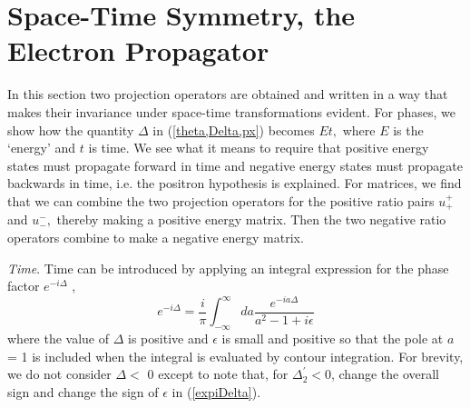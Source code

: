 \documentclass[a4paper,12pt]{article}
\begin{document}
\section{Space-Time Symmetry, the Electron Propagator} \label{space-time} %

	In this section two projection operators are obtained and written in a way that makes their invariance under space-time transformations evident. For phases, we show how the quantity $\Delta$ in (\ref{theta,Delta,px}) becomes $Et,$ where $E$ is the `energy' and $t$ is time. We see what it means to require that positive energy states must propagate forward in time and negative energy states must propagate backwards in time, i.e. the positron hypothesis is explained. For matrices, we find that we can combine the two projection operators for the positive ratio pairs $u_{+}^{+}$ and $u_{-}^{-},$ thereby making a positive energy matrix. Then the two negative ratio operators combine to make a negative energy matrix.

	{\textit{Time}}. Time can be introduced by applying an integral expression \cite{feynman2} for the phase factor $e^{-i\Delta}$ ,
\begin{equation} \label{expiDelta}	%
e^{-i \Delta} = \frac{i}{ \pi} \int_{-\infty}^{\infty} da \frac{e^{-ia\Delta}}{a^2-1+i\epsilon}
\end{equation}
where the value of $\Delta$ is positive and $\epsilon$ is small and positive so that the pole at $a$ = 1 is included when the integral is evaluated by contour integration.  For brevity, we do not consider $\Delta <$ 0 except to note that, for $\Delta_{2}^{\prime} < 0$, change the overall sign and change the sign of $\epsilon$ in (\ref{expiDelta}).
\end{document}
